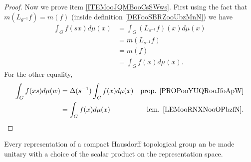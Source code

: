 \begin{proof}
	Now we prove item \ref{ITEMooJQMBooCsSWws}. First using the fact that \( m(L_{g^{-1}}f)=m(f)\) (inside definition \ref{DEFooSBRZooUbzMnN}) we have
	\begin{subequations}
		\begin{align}
			\int_Gf(sx)d\mu(x) & =\int_G(L_{s^{-1}}f)(x)d\mu(x) \\
			                   & =m(L_{s^{-1}}f)                \\
			                   & =m(f)                          \\
			                   & =\int_Gf(x)d\mu(x).
		\end{align}
	\end{subequations}
	For the other equality,
	\begin{subequations}
		\begin{align}
			\int_Gf(xs)d\mu(w) & =\Delta(s^{-1})\int_Gf(x)d\mu(x) & \text{prop. \ref{PROPooYUQRooJfoApW}} \\
			                   & =\int_Gf(x)d\mu(x)               & \text{lem. \ref{LEMooRNXNooOPbzfN}}.
		\end{align}
	\end{subequations}
\end{proof}



\begin{theorem}     \label{THOooCXARooScQJdU}
	Every representation of a compact Hausdorff topological group an be made unitary with a choice of the scalar product on the representation space.
\end{theorem}

